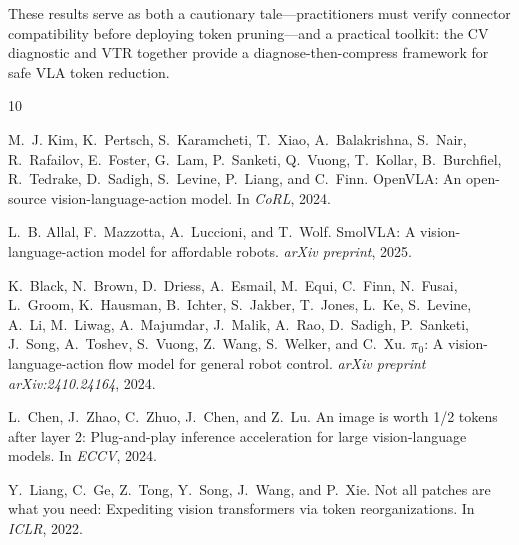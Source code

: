 \documentclass[letterpaper]{article}
\begin{document}
These results serve as both a cautionary tale---practitioners must verify connector compatibility before deploying token pruning---and a practical toolkit: the CV diagnostic and VTR together provide a diagnose-then-compress framework for safe VLA token reduction.



\begin{thebibliography}{10}

M.~J. Kim, K.~Pertsch, S.~Karamcheti, T.~Xiao, A.~Balakrishna, S.~Nair, R.~Rafailov, E.~Foster, G.~Lam, P.~Sanketi, Q.~Vuong, T.~Kollar, B.~Burchfiel, R.~Tedrake, D.~Sadigh, S.~Levine, P.~Liang, and C.~Finn.
\newblock Open{VLA}: An open-source vision-language-action model.
\newblock In \emph{CoRL}, 2024.

L.~B. Allal, F.~Mazzotta, A.~Luccioni, and T.~Wolf.
\newblock Smol{VLA}: A vision-language-action model for affordable robots.
\newblock \emph{arXiv preprint}, 2025.

K.~Black, N.~Brown, D.~Driess, A.~Esmail, M.~Equi, C.~Finn, N.~Fusai, L.~Groom, K.~Hausman, B.~Ichter, S.~Jakber, T.~Jones, L.~Ke, S.~Levine, A.~Li, M.~Liwag, A.~Majumdar, J.~Malik, A.~Rao, D.~Sadigh, P.~Sanketi, J.~Song, A.~Toshev, S.~Vuong, Z.~Wang, S.~Welker, and C.~Xu.
\newblock $\pi_0$: A vision-language-action flow model for general robot control.
\newblock \emph{arXiv preprint arXiv:2410.24164}, 2024.

L.~Chen, J.~Zhao, C.~Zhuo, J.~Chen, and Z.~Lu.
\newblock An image is worth 1/2 tokens after layer 2: Plug-and-play inference acceleration for large vision-language models.
\newblock In \emph{ECCV}, 2024.

Y.~Liang, C.~Ge, Z.~Tong, Y.~Song, J.~Wang, and P.~Xie.
\newblock Not all patches are what you need: Expediting vision transformers via token reorganizations.
\newblock In \emph{ICLR}, 2022.

\end{thebibliography}
\end{document}
